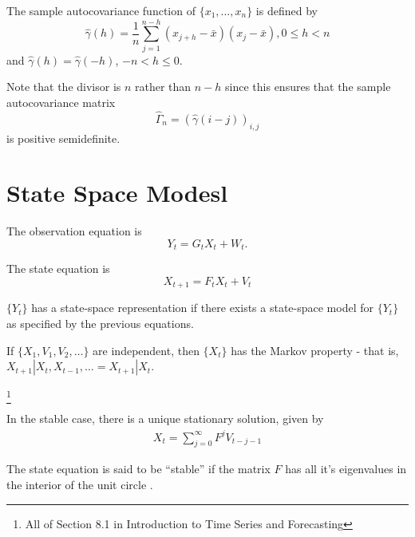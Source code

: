 \begin{defn}
  \label{defn:time_series:12}
  The sample autocovariance function of $\{ x_{1}, \dots, x_{n} \}$ is
  defined by
  \begin{equation}
    \label{eq:7}
    \hat \gamma(h) = \frac{1}{n} \sum_{j=1}^{n-h} (x_{j+h} - \bar
    x)(x_{j} - \bar x), 0 \leq h < n
  \end{equation} and $\hat \gamma(h) = \hat \gamma(-h)$, $-n < h \leq
  0$.

  Note that the divisor is $n$ rather than $n-h$ since this ensures
  that the sample autocovariance matrix
  \begin{equation}
    \label{eq:8}
    \hat \Gamma_{n} = (\hat \gamma(i - j))_{i, j}
  \end{equation} is positive semidefinite.
\end{defn}



\section{State Space Modesl}
\label{sec:state-space-modesl}

\begin{defn}
  \label{defn:time_series:13}
  The observation equation is
  \begin{equation}
    \label{eq:10}
    Y_{t} = G_{t} X_{t} + W_{t}.
  \end{equation}

  The state equation is
  \begin{equation}
    \label{eq:11}
    X_{t+1} = F_{t} X_{t} + V_{t}
  \end{equation}
  
  $\{ Y_{t} \}$ has a state-space representation if there exists a
  state-space model for $\{ Y_{t} \}$ as specified by the previous
  equations.
\end{defn}

\begin{thm}[De Finitte]
  \label{defn:time_series:14}
  If $\{ X_{1}, V_{1}, V_{2}, \dots \} $ are independent, then
  $\{X_{t} \}$ has the Markov property - that is, $X_{t+1} | X_{t},
  X_{t-1}, \dots = X_{t+1} | X_{t}$.
\end{thm}


\footnote{All of Section 8.1 in Introduction to Time Series and
  Forecasting}

In the stable case, there is a unique stationary solution, given by
\begin{align}
  \label{eq:12}
  X_{t} = \sum_{j=0}^{\infty} F^{j} V_{t - j - 1}
\end{align}


\begin{defn}
  \label{defn:time_series:15}
  The state equation is said to be ``stable'' if the matrix $F$ has
  all it's eigenvalues in the interior of the unit circle .  
\end{defn}

